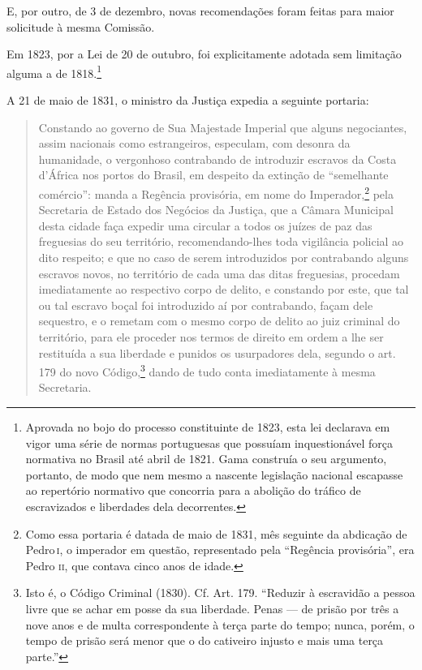 {E, por outro, de 3 de dezembro, novas recomendações foram feitas para
maior solicitude à mesma Comissão.

Em 1823, por a Lei de 20 de outubro, foi explicitamente adotada sem
limitação alguma a de 1818.\footnote{Aprovada no bojo do processo
  constituinte de 1823, esta lei declarava em vigor uma série de normas
  portuguesas que possuíam inquestionável força normativa no Brasil até
  abril de 1821. Gama construía o seu argumento, portanto, de modo que
  nem mesmo a nascente legislação nacional escapasse ao repertório
  normativo que concorria para a abolição do tráfico de escravizados e
  liberdades dela decorrentes.}

A 21 de maio de 1831, o ministro da Justiça expedia a seguinte portaria:

\begin{quote}
Constando ao governo de Sua Majestade Imperial que alguns negociantes,
assim nacionais como estrangeiros, especulam, com desonra da humanidade,
o vergonhoso contrabando de introduzir escravos da Costa d'África nos
portos do Brasil, em despeito da extinção de ``semelhante comércio'':
manda a Regência provisória, em nome do Imperador,\footnote{Como essa
  portaria é datada de maio de 1831, mês seguinte da abdicação de Pedro\,\textsc{i}, o imperador em questão, representado pela ``Regência provisória'', era
  Pedro \textsc{ii}, que contava cinco anos de idade.} pela Secretaria de
Estado dos Negócios da Justiça, que a Câmara Municipal desta cidade faça
expedir uma circular a todos os juízes de paz das freguesias do seu
território, recomendando-lhes toda vigilância policial ao dito respeito;
e que no caso de serem introduzidos por contrabando alguns escravos
novos, no território de cada uma das ditas freguesias, procedam
imediatamente ao respectivo corpo de delito, e constando por este, que
tal ou tal escravo boçal foi introduzido aí por contrabando, façam dele
sequestro, e o remetam com o mesmo corpo de delito ao juiz criminal do
território, para ele proceder nos termos de direito em ordem a lhe ser
restituída a sua liberdade e punidos os usurpadores dela, segundo o art.
179 do novo Código,\footnote{Isto é, o Código Criminal (1830). Cf. Art.
  179. ``Reduzir à escravidão a pessoa livre que se achar em posse da sua
  liberdade. Penas --- de prisão por três a nove anos e de multa
  correspondente à terça parte do tempo; nunca, porém, o tempo de prisão
  será menor que o do cativeiro injusto e mais uma terça parte.''} dando
de tudo conta imediatamente à mesma Secretaria.


\end{quote}}
